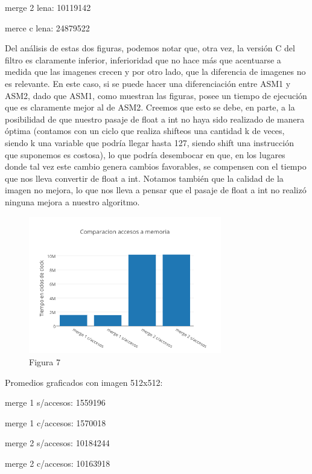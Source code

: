 \documentclass[a4paper]{article}
\begin{document}
merge 2 lena: 10119142

merce c lena: 24879522

Del análisis de estas dos figuras, podemos notar que, otra vez, la versión C del filtro es claramente inferior, inferioridad que no hace más que acentuarse a medida que las imagenes crecen y por otro lado, que la diferencia de imagenes no es relevante. En este caso, si se puede hacer una diferenciación entre ASM1 y ASM2, dado que ASM1, como muestran las figuras, posee un tiempo de ejecución que es claramente mejor al de ASM2. Creemos que esto se debe, en parte, a la posibilidad de que nuestro pasaje de float a int no haya sido realizado de manera óptima (contamos con un ciclo que realiza shifteos una cantidad k de veces, siendo k una variable que podría llegar hasta 127, siendo shift una instrucción que suponemos es costosa), lo que podría desembocar en que, en los lugares donde tal vez este cambio genera cambios favorables, se compensen con el tiempo que nos lleva convertir de float a int.	Notamos también que la calidad de la imagen no mejora, lo que nos lleva a pensar que el pasaje de float a int no realizó ninguna mejora a nuestro algoritmo. 

\begin{figure}[h]
  \centering
    \includegraphics[width=0.75\textwidth]{imagenes/ComparacionAccesosAMemoriaMergeColores.png}
  \caption{Figura 7}
  \label{fig:graficomerge3}
\end{figure}
 \FloatBarrier
 
Promedios graficados con imagen 512x512:

merge 1 s/accesos: 1559196

merge 1 c/accesos: 1570018

merge 2 s/accesos: 10184244

merge 2 c/accesos: 10163918
\end{document}

